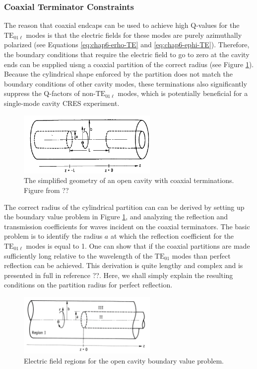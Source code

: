 \subsubsection*{Coaxial Terminator Constraints}

The reason that coaxial endcaps can be used to achieve high Q-values for the $\mathrm{TE}_{01\ell}$ modes is that the electric fields for these modes are purely azimuthally polarized (see Equations \ref{eq:chap6-erho-TE} and \ref{eq:chap6-ephi-TE}). Therefore, the boundary conditions that require the electric field to go to zero at the cavity ends can be supplied uisng a coaxial partition of the correct radius (see Figure \ref{fig:chap6-open-cavity-sketch}). Because the cylindrical shape enforced by the partition does not match the boundary conditions of other cavity modes, these terminations also significantly suppress the Q-factors of non-$\mathrm{TE}_{01\ell}$ modes, which is potentially beneficial for a single-mode cavity CRES experiment.  
\begin{figure}[htbp]
    \centering
    \includegraphics*[width=0.6\textwidth]{figs/Chapter-6/230606_open_cavity_sketch.png}
    \caption{\label{fig:chap6-open-cavity-sketch} The simplified geometry of an open cavity with coaxial terminations. Figure from ??}
\end{figure}

The correct radius of the cylindrical partition can can be derived by setting up the boundary value problem in Figure \ref{fig:chap6-open-cavity-sketch}, and analyzing the reflection and transmission coefficients for waves incident on the coaxial terminators. The basic problem is to identify the radius $a$ at which the reflection coefficient for the $\mathrm{TE}_{01\ell}$ modes is equal to 1. One can show that if the coaxial partitions are made sufficiently long relative to the wavelength of the $\mathrm{TE}_{01}$ modes than perfect reflection can be achieved. This derivation is quite lengthy and complex and is presented in full in reference ??. Here, we shall simply explain the resulting conditions on the partition radius for perfect reflection.

\begin{figure}[htbp]
    \centering
    \includegraphics*[width=0.6\textwidth]{figs/Chapter-6/230612_open_cavity_regions.png}
    \caption{\label{fig:chap6-open-cavity-regions} Electric field regions for the open cavity boundary value problem.}
\end{figure}

